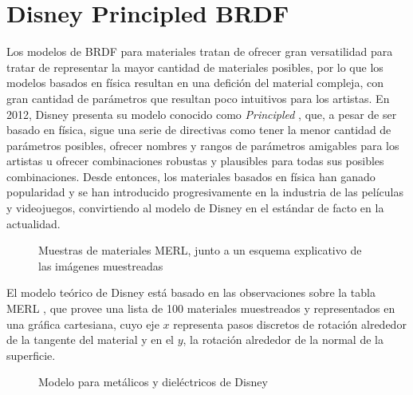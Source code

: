     
    \section{Disney Principled BRDF}
    Los modelos de BRDF para materiales tratan de ofrecer gran versatilidad para tratar de representar la mayor cantidad de
    materiales posibles, por lo que los modelos basados en f\'isica resultan en una defici\'on del material compleja,
    con gran cantidad de par\'ametros que resultan poco intuitivos para los artistas. En 2012, Disney presenta su modelo
    conocido como \textit{Principled} \autocite{disney12}, que, a pesar de ser basado en f\'isica, sigue una serie de directivas
    como tener la menor cantidad de par\'ametros posibles, ofrecer nombres y rangos de par\'ametros amigables para los artistas u ofrecer
    combinaciones robustas y plausibles para todas sus posibles combinaciones. Desde entonces, los materiales basados en f\'isica
    han ganado popularidad y se han introducido progresivamente en la industria de las pel\'iculas y videojuegos, convirtiendo
    al modelo de Disney en el est\'andar de facto en la actualidad.\\

    \begin{figure}[H]
        \vspace{0.5cm}
        \centering
        \caption{Muestras de materiales MERL, junto a un esquema explicativo de las im\'agenes muestreadas}
        \vspace{0.5cm}
    \end{figure}

    El modelo te\'orico de Disney est\'a basado en las observaciones sobre la tabla MERL \autocite{merl}, que provee una lista
    de 100 materiales muestreados y representados en una gr\'afica cartesiana, cuyo eje $x$ representa pasos discretos de rotaci\'on
    alrededor de la tangente del material y en el $y$, la rotaci\'on alrededor de la normal de la superficie. 

    \begin{figure}[H]
        \vspace{0.5cm}
        \centering
        \caption{Modelo para met\'alicos y diel\'ectricos de Disney}
    \end{figure}

